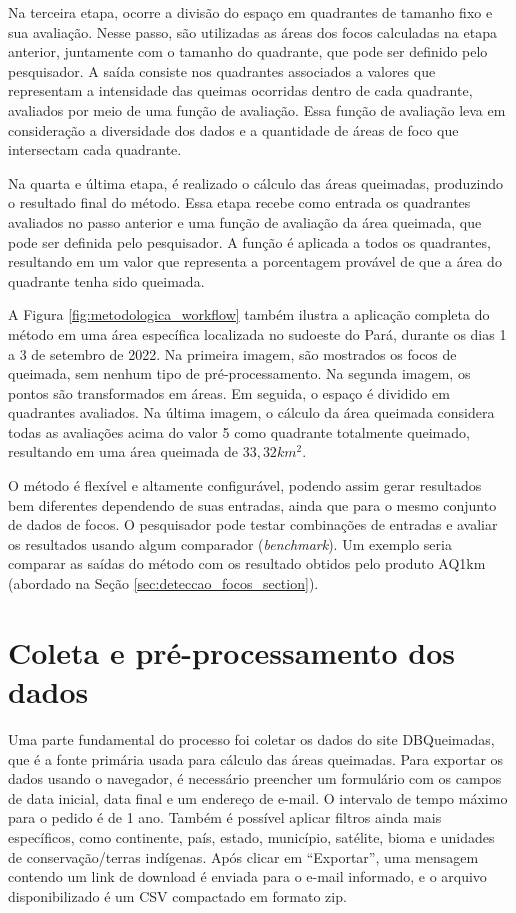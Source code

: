 \documentclass[cic,tc]{iiufrgs}
\begin{document}
Na terceira etapa, ocorre a divisão do espaço em quadrantes de tamanho fixo e sua avaliação. Nesse passo, são utilizadas as áreas dos focos calculadas na etapa anterior, juntamente com o tamanho do quadrante, que pode ser definido pelo pesquisador. A saída consiste nos quadrantes associados a valores que representam a intensidade das queimas ocorridas dentro de cada quadrante, avaliados por meio de uma função de avaliação. Essa função de avaliação leva em consideração a diversidade dos dados e a quantidade de áreas de foco que intersectam cada quadrante.

Na quarta e última etapa, é realizado o cálculo das áreas queimadas, produzindo o resultado final do método. Essa etapa recebe como entrada os quadrantes avaliados no passo anterior e uma função de avaliação da área queimada, que pode ser definida pelo pesquisador. A função é aplicada a todos os quadrantes, resultando em um valor que representa a porcentagem provável de que a área do quadrante tenha sido queimada.

A Figura \ref{fig:metodologica_workflow} também ilustra a aplicação completa do método em uma área específica localizada no sudoeste do Pará, durante os dias 1 a 3 de setembro de 2022. Na primeira imagem, são mostrados os focos de queimada, sem nenhum tipo de pré-processamento. Na segunda imagem, os pontos são transformados em áreas. Em seguida, o espaço é dividido em quadrantes avaliados. Na última imagem, o cálculo da área queimada considera todas as avaliações acima do valor 5 como quadrante totalmente queimado, resultando em uma área queimada de $33,32 km^2$.

O método é flexível e altamente configurável, podendo assim gerar resultados bem diferentes dependendo de suas entradas, ainda que para o mesmo conjunto de dados de focos. O pesquisador pode testar combinações de entradas e avaliar os resultados usando algum comparador (\textit{benchmark}). Um exemplo seria comparar as saídas do método com os resultado obtidos pelo produto AQ1km (abordado na Seção \ref{sec:deteccao_focos_section}).

\section{Coleta e pré-processamento dos dados}

Uma parte fundamental do processo foi coletar os dados do site DBQueimadas, que é a fonte primária usada para cálculo das áreas queimadas. Para exportar os dados usando o navegador, é necessário preencher um formulário com os campos de data inicial, data final e um endereço de e-mail. O intervalo de tempo máximo para o pedido é de 1 ano. Também é possível aplicar filtros ainda mais específicos, como continente, país, estado, município, satélite, bioma e unidades de conservação/terras indígenas. Após clicar em ``Exportar'', uma mensagem contendo um link de download é enviada para o e-mail informado, e o arquivo disponibilizado é um CSV compactado em formato zip.
\end{document}

